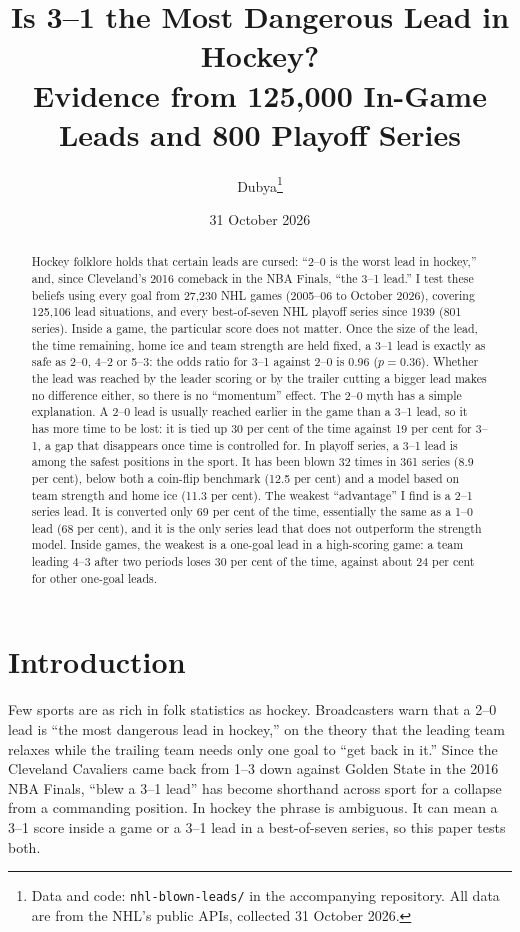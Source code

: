 \documentclass[11pt]{article}
\title{Is 3--1 the Most Dangerous Lead in Hockey?\\[2pt]\large Evidence from 125,000 In-Game Leads and 800 Playoff Series}
\author{Dubya\thanks{Data and code: \texttt{nhl-blown-leads/} in the accompanying repository. All data are from the NHL's public APIs, collected 31 October 2026.}}
\date{31 October 2026}
\begin{document}
\maketitle

\begin{abstract}\noindent
Hockey folklore holds that certain leads are cursed: ``2--0 is the worst lead in hockey,'' and, since Cleveland's 2016 comeback in the NBA Finals, ``the 3--1 lead.'' I test these beliefs using every goal from 27,230 NHL games (2005--06 to October 2026), covering 125,106 lead situations, and every best-of-seven NHL playoff series since 1939 (801 series). Inside a game, the particular score does not matter. Once the size of the lead, the time remaining, home ice and team strength are held fixed, a 3--1 lead is exactly as safe as 2--0, 4--2 or 5--3: the odds ratio for 3--1 against 2--0 is 0.96 ($p=0.36$). Whether the lead was reached by the leader scoring or by the trailer cutting a bigger lead makes no difference either, so there is no ``momentum'' effect. The 2--0 myth has a simple explanation. A 2--0 lead is usually reached earlier in the game than a 3--1 lead, so it has more time to be lost: it is tied up 30 per cent of the time against 19 per cent for 3--1, a gap that disappears once time is controlled for. In playoff series, a 3--1 lead is among the safest positions in the sport. It has been blown 32 times in 361 series (8.9 per cent), below both a coin-flip benchmark (12.5 per cent) and a model based on team strength and home ice (11.3 per cent). The weakest ``advantage'' I find is a 2--1 series lead. It is converted only 69 per cent of the time, essentially the same as a 1--0 lead (68 per cent), and it is the only series lead that does not outperform the strength model. Inside games, the weakest is a one-goal lead in a high-scoring game: a team leading 4--3 after two periods loses 30 per cent of the time, against about 24 per cent for other one-goal leads.
\end{abstract}

\section{Introduction}

Few sports are as rich in folk statistics as hockey. Broadcasters warn that a 2--0 lead is ``the most dangerous lead in hockey,'' on the theory that the leading team relaxes while the trailing team needs only one goal to ``get back in it.'' Since the Cleveland Cavaliers came back from 1--3 down against Golden State in the 2016 NBA Finals, ``blew a 3--1 lead'' has become shorthand across sport for a collapse from a commanding position. In hockey the phrase is ambiguous. It can mean a 3--1 score inside a game or a 3--1 lead in a best-of-seven series, so this paper tests both.
\end{document}
